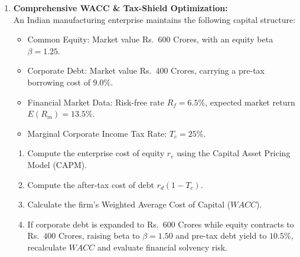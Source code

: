 \begin{enumerate}[label=\textbf{P7.\arabic*}]
    \item \textbf{Comprehensive WACC \& Tax-Shield Optimization:}\\
    An Indian manufacturing enterprise maintains the following capital structure:
    \begin{itemize}
        \item Common Equity: Market value Rs.~$600$ Crores, with an equity beta $\beta = 1.25$.
        \item Corporate Debt: Market value Rs.~$400$ Crores, carrying a pre-tax borrowing cost of $9.0\%$.
        \item Financial Market Data: Risk-free rate $R_f = 6.5\%$, expected market return $E(R_m) = 13.5\%$.
        \item Marginal Corporate Income Tax Rate: $T_c = 25\%$.
    \end{itemize}
    \begin{enumerate}[label=(\alph*)]
        \item Compute the enterprise cost of equity $r_e$ using the Capital Asset Pricing Model (CAPM).
        \item Compute the after-tax cost of debt $r_d(1 - T_c)$.
        \item Calculate the firm's Weighted Average Cost of Capital ($WACC$).
        \item If corporate debt is expanded to Rs.~$600$ Crores while equity contracts to Rs.~$400$ Crores, raising beta to $\beta = 1.50$ and pre-tax debt yield to $10.5\%$, recalculate $WACC$ and evaluate financial solvency risk.
    \end{enumerate}


\end{enumerate}
